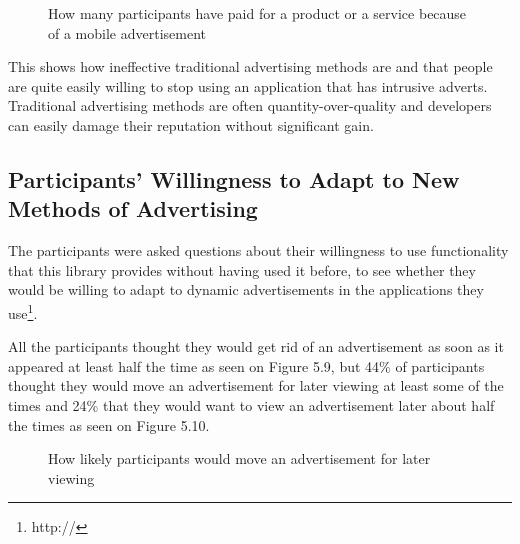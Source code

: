 \begin{figure}
\begin{center}
\caption{How many participants have paid for a product or a service because of a mobile advertisement}
\end{center}
\end{figure}

This shows how ineffective traditional advertising methods are and that people are quite easily willing to stop using an application that has intrusive adverts. Traditional advertising methods are often quantity-over-quality and developers can easily damage their reputation without significant gain.

\subsection{Participants' Willingness to Adapt to New Methods of Advertising}

The participants were asked questions about their willingness to use functionality that this library provides without having used it before, to see whether they would be willing to adapt to dynamic advertisements in the applications they use\footnote{http://}.

All the participants thought they would get rid of an advertisement as soon as it appeared at least half the time as seen on Figure 5.9, but 44\% of participants thought they would move an advertisement for later viewing at least some of the times and 24\% that they would want to view an advertisement later about half the times as seen on Figure 5.10. 

\begin{figure}
\begin{center}
\caption{How likely participants would move an advertisement for later viewing}
\end{center}
\end{figure}

